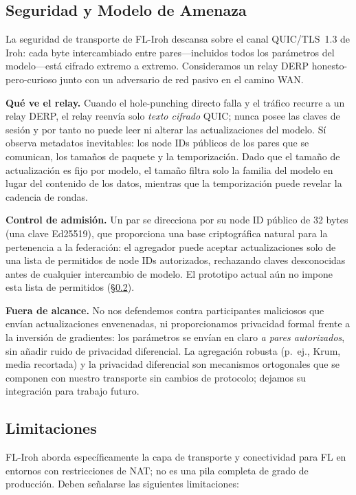 \documentclass[journal]{IEEEtran}
\begin{document}
\subsection{Seguridad y Modelo de Amenaza}
\label{sec:threat}

La seguridad de transporte de FL-Iroh descansa sobre el canal QUIC/TLS~1.3 de Iroh: cada byte intercambiado entre pares---incluidos todos los parámetros del modelo---está cifrado extremo a extremo. Consideramos un relay DERP honesto-pero-curioso junto con un adversario de red pasivo en el camino WAN.

\textbf{Qué ve el relay.} Cuando el hole-punching directo falla y el tráfico recurre a un relay DERP, el relay reenvía solo \emph{texto cifrado} QUIC; nunca posee las claves de sesión y por tanto no puede leer ni alterar las actualizaciones del modelo. Sí observa metadatos inevitables: los node IDs públicos de los pares que se comunican, los tamaños de paquete y la temporización. Dado que el tamaño de actualización es fijo por modelo, el tamaño filtra solo la familia del modelo en lugar del contenido de los datos, mientras que la temporización puede revelar la cadencia de rondas.

\textbf{Control de admisión.} Un par se direcciona por su node ID público de 32 bytes (una clave Ed25519), que proporciona una base criptográfica natural para la pertenencia a la federación: el agregador puede aceptar actualizaciones solo de una lista de permitidos de node IDs autorizados, rechazando claves desconocidas antes de cualquier intercambio de modelo. El prototipo actual aún no impone esta lista de permitidos (\S\ref{sec:limitations}).

\textbf{Fuera de alcance.} No nos defendemos contra participantes maliciosos que envían actualizaciones envenenadas, ni proporcionamos privacidad formal frente a la inversión de gradientes: los parámetros se envían en claro \emph{a pares autorizados}, sin añadir ruido de privacidad diferencial. La agregación robusta (p.~ej., Krum, media recortada) y la privacidad diferencial son mecanismos ortogonales que se componen con nuestro transporte sin cambios de protocolo; dejamos su integración para trabajo futuro.

\subsection{Limitaciones}
\label{sec:limitations}

FL-Iroh aborda específicamente la capa de transporte y conectividad para FL en entornos con restricciones de NAT; no es una pila completa de grado de producción. Deben señalarse las siguientes limitaciones:
\end{document}
